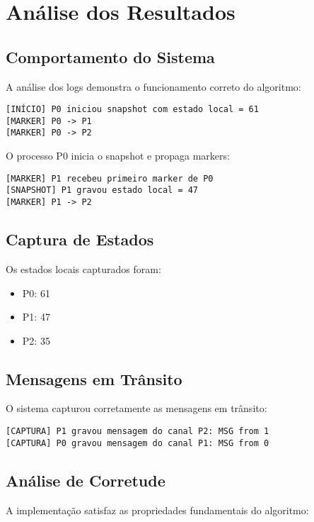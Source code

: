 \documentclass[12pt]{article}
\begin{document}
\section{Análise dos Resultados}

\subsection{Comportamento do Sistema}

A análise dos logs demonstra o funcionamento correto do algoritmo:

\begin{verbatim}
[INÍCIO] P0 iniciou snapshot com estado local = 61
[MARKER] P0 -> P1
[MARKER] P0 -> P2
\end{verbatim}

O processo P0 inicia o snapshot e propaga markers:

\begin{verbatim}
[MARKER] P1 recebeu primeiro marker de P0
[SNAPSHOT] P1 gravou estado local = 47
[MARKER] P1 -> P2
\end{verbatim}

\subsection{Captura de Estados}

Os estados locais capturados foram:
\begin{itemize}
    \item P0: 61
    \item P1: 47
    \item P2: 35
\end{itemize}

\subsection{Mensagens em Trânsito}

O sistema capturou corretamente as mensagens em trânsito:

\begin{verbatim}
[CAPTURA] P1 gravou mensagem do canal P2: MSG from 1
[CAPTURA] P0 gravou mensagem do canal P1: MSG from 0
\end{verbatim}

\subsection{Análise de Corretude}

A implementação satisfaz as propriedades fundamentais do algoritmo:
\end{document}
